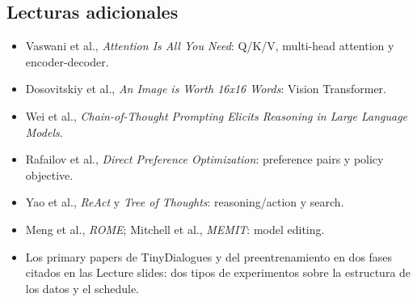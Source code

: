 \documentclass[a4paper]{article}
\begin{document}
\subsection{Lecturas adicionales}

\begin{itemize}
  \item Vaswani et al., \emph{Attention Is All You Need}: Q/K/V, multi-head attention y encoder-decoder.
  \item Dosovitskiy et al., \emph{An Image is Worth 16x16 Words}: Vision Transformer.
  \item Wei et al., \emph{Chain-of-Thought Prompting Elicits Reasoning in Large Language Models}.
  \item Rafailov et al., \emph{Direct Preference Optimization}: preference pairs y policy objective.
  \item Yao et al., \emph{ReAct} y \emph{Tree of Thoughts}: reasoning/action y search.
  \item Meng et al., \emph{ROME}; Mitchell et al., \emph{MEMIT}: model editing.
  \item Los primary papers de TinyDialogues y del preentrenamiento en dos fases citados en las Lecture slides: dos tipos de experimentos sobre la estructura de los datos y el schedule.
\end{itemize}
\end{document}

